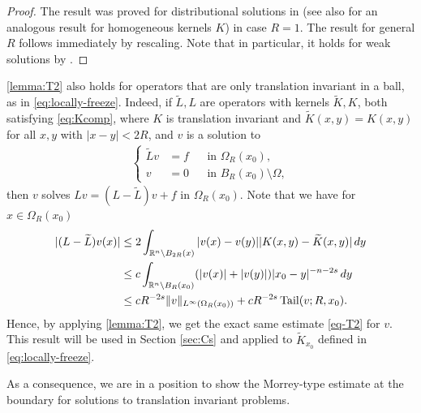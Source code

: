 \documentclass[11pt,reqno]{amsart}
\theoremstyle{plain}
\theoremstyle{definition}
\numberwithin{equation}{section}
\newcommand{\R}{\mathbb{R}}
\newcommand{\1}{\mathbbm{1}}
\DeclareMathOperator{\tail}{Tail}
\renewcommand{\d}{\textnormal{\,d}}
\begin{document}
\begin{proof}
    The result was proved for distributional solutions in \cite[Theorem~6.8]{RoWe24} (see also \cite[Proposition~2.5.4]{FeRo24} for an analogous result for homogeneous kernels $K$) in case $R = 1$. The result for general $R$ follows immediately by rescaling. Note that in particular, it holds for weak solutions by \cite[Lemma~2.2.32]{FeRo24}.
\end{proof}

\begin{remark}\label{rmk:T2}
\autoref{lemma:T2} also holds for operators that are only translation invariant in a ball, as in \eqref{eq:locally-freeze}. Indeed, if $\widetilde{L},L$ are operators with kernels $\widetilde{K}, K$, both satisfying \eqref{eq:Kcomp}, where $K$ is translation invariant and $\widetilde{K}(x, y)=K(x, y)$ for all $x, y$ with $|x-y| < 2R$, and $v$ is a solution to
\begin{align*}
\left\{
\begin{aligned}
\widetilde{L}v&=f &&\text{in }\Omega_R(x_0), \\
v&=0 &&\text{in } B_R(x_0) \setminus \Omega,
\end{aligned}
\right.
\end{align*}
then $v$ solves $Lv = (L-\widetilde{L})v+f$ in $\Omega_R(x_0)$. Note that we have for $x \in \Omega_{R}(x_0)$
\begin{align*}
    |(L - \widetilde{L}) v(x)| &\le 2 \int_{\R^n \setminus B_{2R}(x)} |v(x) - v(y)||K(x,y) - \widetilde{K}(x,y)| \d y \\
    &\le c  \int_{\R^n \setminus B_{R}(x_0)} (|v(x)| + |v(y)|) |x_0 -y|^{-n-2s} \d y \\
    &\le cR^{-2s} \Vert v \Vert_{L^{\infty}(\Omega_{R}(x_0))} + c R^{-2s} \tail(v;R,x_0).
\end{align*}
Hence, by applying \autoref{lemma:T2}, we get the exact same estimate \eqref{eq-T2} for $v$. This result will be used in Section \ref{sec:Cs} and applied to $\widetilde{K}_{x_0}$ defined in \eqref{eq:locally-freeze}.
\end{remark}


As a consequence, we are in a position to show the Morrey-type estimate at the boundary for solutions to translation invariant problems.
\end{document}
